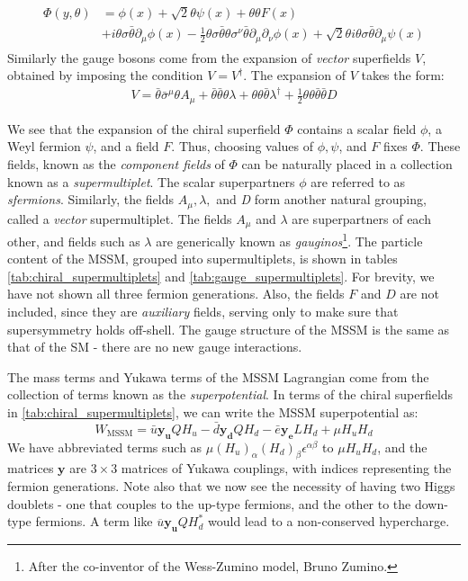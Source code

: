 \begin{align}
  \begin{split}
  \Phi(y,\theta) &= \phi(x) + \sqrt{2}\theta\psi(x)+\theta\theta F(x)\\
  &+i\theta\sigma\bar{\theta}\partial_\mu\phi(x)-\frac{1}{2}\theta\sigma\bar{\theta}\theta\sigma^\nu\bar{\theta}\partial_\mu\partial_\nu\phi(x) + \sqrt{2}\theta i\theta\sigma\bar{\theta}\partial_\mu\psi(x)
\end{split}
  \label{eq:chiral_superfield_expansion}
\end{align}
Similarly the gauge bosons come from the expansion of \emph{vector} superfields $V$, obtained by imposing the condition $V = V^\dagger$. The expansion of $V$ takes the form:
\begin{align}
V = \bar{\theta}\bar{\sigma}^\mu\theta A_\mu+\bar{\theta}\bar{\theta}\theta\lambda+\theta\theta\bar{\theta}\lambda^\dagger+\frac{1}{2}\theta\theta\bar{\theta}\bar{\theta}D
\label{eq:vector_superfield_expansion}
\end{align}

We see that the expansion of the chiral superfield $\Phi$ contains a scalar field $\phi$, a Weyl fermion $\psi$, and a field $F$. Thus, choosing values of $\phi,\psi$, and $F$ fixes $\Phi$. These fields, known as the \emph{component fields} of $\Phi$ can be naturally placed in a collection known as a \emph{supermultiplet}. The scalar superpartners $\phi$ are referred to as \emph{sfermions}. 
Similarly, the fields $A_\mu,\lambda,$ and \emph{D} form another natural grouping, called a \emph{vector} supermultiplet. The fields $A_\mu$ and $\lambda$ are superpartners of each other, and fields such as $\lambda$ are generically known as \emph{gauginos}\footnote{After the co-inventor of the Wess-Zumino model, Bruno Zumino.}. The particle content of the MSSM, grouped into supermultiplets, is shown in tables \ref{tab:chiral_supermultiplets} and \ref{tab:gauge_supermultiplets}. For brevity, we have not shown all three fermion generations. Also, the fields $F$ and $D$ are not included, since they are \emph{auxiliary} fields, serving only to make sure that supersymmetry holds off-shell. The gauge structure of the MSSM is the same as that of the SM - there are no new gauge interactions.

The mass terms and Yukawa terms of the MSSM Lagrangian come from the collection of terms known as the \emph{superpotential}. In terms of the chiral superfields in \autoref{tab:chiral_supermultiplets}, we can write the MSSM superpotential as:
\[W_\text{MSSM} = \bar{u}\mathbf{y_u}QH_u-\bar{d}\mathbf{y_d}Q H_d-\bar{e}\mathbf{y_e}L H_d+\mu H_u H_d \]
We have abbreviated terms such as $\mu(H_u)_\alpha (H_d)_\beta\epsilon^{\alpha\beta}$ to $\mu H_u H_d$, and the matrices $\mathbf{y}$ are $3\times3$ matrices of Yukawa couplings, with indices representing the fermion generations. Note also that we now see the necessity of having two Higgs doublets - one that couples to the up-type fermions, and the other to the down-type fermions. A term like $\overline{u}\mathbf{y_u}QH_d^*$ would lead to a non-conserved hypercharge.

